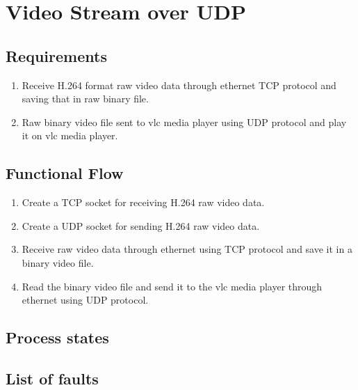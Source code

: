 \newpage
\section{ Video Stream over UDP}
\subsection{Requirements}

\begin{enumerate}
	\item Receive H.264 format raw video data through ethernet TCP protocol and saving that in raw binary file.
	\item  Raw binary video file sent to vlc media player using UDP protocol and play it on vlc media player.
\end{enumerate}

\subsection{Functional Flow}

\begin{enumerate}
	\item Create a TCP socket for receiving H.264 raw video data.
	\item Create a UDP socket for sending H.264 raw video data.
	\item Receive  raw video data through ethernet using  TCP protocol and save it in a binary video file.
	\item Read the binary video file and send it to the vlc media player through ethernet using UDP protocol.
\end{enumerate}

\subsection{Process states}

\subsection{List of faults}